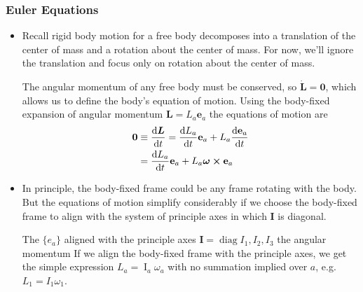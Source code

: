 \documentclass[11pt, a4paper]{article}
\newcommand{\e}{\mathbf{e}} %
\newcommand{\mat}[1]{\mathbf{#1}} %
\begin{document}
\subsubsection{Euler Equations}
\begin{itemize}
	\item Recall rigid body motion for a free body decomposes into a translation of the center of mass and a rotation about the center of mass. For now, we'll ignore the translation and focus only on rotation about the center of mass.
	
	The angular momentum of any free body must be conserved, so $ \dot{\bm{L}} = \bm{0} $, which allows us to define the body's equation of motion. Using the body-fixed expansion of angular momentum $ \bm{L} = L_{a} \e_{a}  $ the equations of motion are
	\begin{align*}
		\bm{0} &\equiv \dv{\bm{L}}{t} = \dv{{L}_{a}}{t}\e_{a} + L_{a} \dv{{\e}_{a}}{t}  \\
		&= \dv{{L}_{a}}{t} \e_{a} + L_{a}\bm{\omega} \cross \e_{a}
	\end{align*}
	
	\item In principle, the body-fixed frame could be any frame rotating with the body. But the equations of motion simplify considerably if we choose the body-fixed frame to align with the system of principle axes in which $ \mathbf{I} $ is diagonal. 
	
	The $ \{e_{a}\} $ aligned with the principle axes $ \mat{I} = \operatorname{diag}{I_{1}, I_{2}, I_{3}} $ the angular momentum 
	If we align the body-fixed frame with the principle axes, we get the simple expression $ L_{a} = \operatorname{I}_{a} \omega_{a} $ with no summation implied over $ a $, e.g. $ L_{1} = I_{1}\omega_{1} $.
	

\end{itemize}
\end{document}
